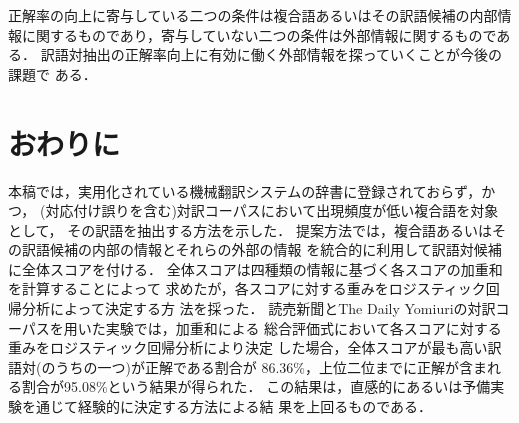正解率の向上に寄与している二つの条件は複合語あるいはその訳語候補の内部情
報に関するものであり，寄与していない二つの条件は外部情報に関するものであ
る．
訳語対抽出の正解率向上に有効に働く外部情報を探っていくことが今後の課題で
ある．


\section{おわりに}

本稿では，実用化されている機械翻訳システムの辞書に登録されておらず，かつ，
(対応付け誤りを含む)対訳コーパスにおいて出現頻度が低い複合語を対象として，
その訳語を抽出する方法を示した． 
提案方法では，複合語あるいはその訳語候補の内部の情報とそれらの外部の情報
を統合的に利用して訳語対候補に全体スコアを付ける．
全体スコアは四種類の情報に基づく各スコアの加重和を計算することによって
求めたが，各スコアに対する重みをロジスティック回帰分析によって決定する方
法を採った．
読売新聞とThe Daily Yomiuriの対訳コーパスを用いた実験では，加重和による
総合評価式において各スコアに対する重みをロジスティック回帰分析により決定
した場合，全体スコアが最も高い訳語対(のうちの一つ)が正解である割合が
86.36\%，上位二位までに正解が含まれる割合が95.08\%という結果が得られた．
この結果は，直感的にあるいは予備実験を通じて経験的に決定する方法による結
果を上回るものである． 

